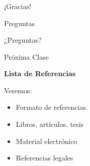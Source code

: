 \documentclass[aspectratio=169]{beamer}
\begin{document}
\begin{frame}
	\frametitle{}
	\centering
	\Huge ¡Gracias!
	\vspace{2em}
	
	\Large Preguntas
\end{frame}







\begin{frame}[standout]
\Huge ¿Preguntas?
\end{frame}

\begin{frame}{Próxima Clase}
\begin{center}
\Large \textbf{Lista de Referencias}
\vspace{1cm}

Veremos:
\begin{itemize}
    \item Formato de referencias
    \item Libros, artículos, tesis
    \item Material electrónico
    \item Referencias legales
\end{itemize}
\end{center}
\end{frame}
\end{document}
